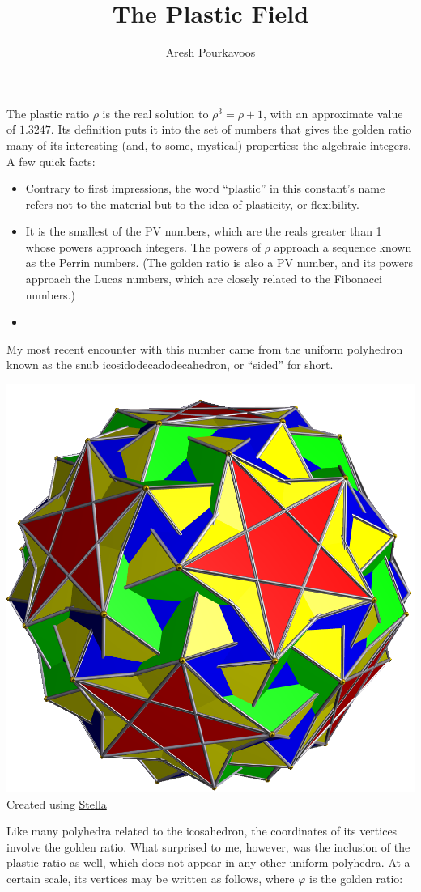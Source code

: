\documentclass{article}
\begin{document}
\title{The Plastic Field}
\author{Aresh Pourkavoos}
\maketitle

The plastic ratio $\rho$ is the real solution to $\rho^3 = \rho+1$,
with an approximate value of $1.3247$.
Its definition puts it into the set of numbers
that gives the golden ratio many of its interesting
(and, to some, mystical) properties: the algebraic integers.
A few quick facts:
\begin{itemize}
  \item
    Contrary to first impressions,
    the word ``plastic'' in this constant's name
    refers not to the material but to the idea of plasticity, or flexibility.
  \item
    It is the smallest of the PV numbers,
    which are the reals greater than 1
    whose powers approach integers.
    The powers of $\rho$ approach a sequence known as the Perrin numbers.
    (The golden ratio is also a PV number,
    and its powers approach the Lucas numbers,
    which are closely related to the Fibonacci numbers.)
  \item
    
\end{itemize}

My most recent encounter with this number
came from the uniform polyhedron known as
the snub icosidodecadodecahedron, or ``sided'' for short.

\begin{center}
  \includegraphics[width=0.25\linewidth]{sided.png} \\
  Created using \href{http://www.software3d.com/Stella.php}{Stella}
\end{center}

Like many polyhedra related to the icosahedron,
the coordinates of its vertices involve the golden ratio.
What surprised to me, however,
was the inclusion of the plastic ratio as well,
which does not appear in any other uniform polyhedra.
At a certain scale, its vertices may be written as follows,
where $\varphi$ is the golden ratio:
\end{document}
